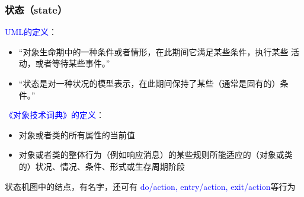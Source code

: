 \documentclass[compress]{beamer}
\begin{document}
  \begin{frame}
    \frametitle{状态（state）}
     {
    \textcolor{blue}{UML的定义}： 
    \begin{itemize}
      \item “对象生命期中的一种条件或者情形，在此期间它满足某些条件，执行某些
      活动，或者等待某些事件。” \\
    \item “状态是对一种状况的模型表示，在此期间保持了某些（通常是固有的）条
      件。”
    \end{itemize}

      \textcolor{blue}{《对象技术词典》的定义}： \\
      \begin{itemize}
        \item 对象或者类的所有属性的当前值 
        \item 对象或者类的整体行为（例如响应消息）的某些规则所能适应的（对象或类
      的）状况、情况、条件、形式或生存周期阶段
      \end{itemize}
    }
     {
    状态机图中的结点，有名字，还可有 \textcolor{blue}{do/action, entry/action, exit/action}等行为\\[2ex]
    }
  \end{frame}
\end{document}
